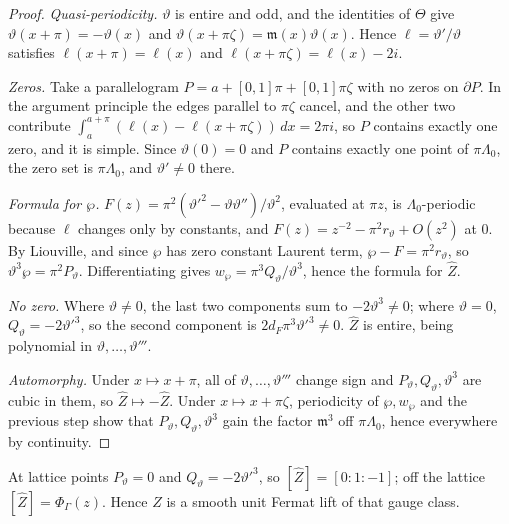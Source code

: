 \begin{proof}
\emph{Quasi-periodicity.} $\vartheta$ is entire and odd, and the identities of $\Theta$ give $\vartheta(x+\pi)=-\vartheta(x)$ and $\vartheta(x+\pi\zeta)=\mathfrak m(x)\vartheta(x)$. Hence $\ell=\vartheta'/\vartheta$ satisfies $\ell(x+\pi)=\ell(x)$ and $\ell(x+\pi\zeta)=\ell(x)-2i$.

\emph{Zeros.} Take a parallelogram $P=a+[0,1]\pi+[0,1]\pi\zeta$ with no zeros on $\partial P$. In the argument principle the edges parallel to $\pi\zeta$ cancel, and the other two contribute $\int_a^{a+\pi}(\ell(x)-\ell(x+\pi\zeta))\,dx=2\pi i$, so $P$ contains exactly one zero, and it is simple. Since $\vartheta(0)=0$ and $P$ contains exactly one point of $\pi\Lambda_0$, the zero set is $\pi\Lambda_0$, and $\vartheta'\ne0$ there.

\emph{Formula for $\wp$.} $F(z)=\pi^2(\vartheta'^2-\vartheta\vartheta'')/\vartheta^2$, evaluated at $\pi z$, is $\Lambda_0$-periodic because $\ell$ changes only by constants, and $F(z)=z^{-2}-\pi^2r_\vartheta+O(z^2)$ at $0$. By Liouville, and since $\wp$ has zero constant Laurent term, $\wp-F=\pi^2r_\vartheta$, so $\vartheta^3\wp=\pi^2P_\vartheta$. Differentiating gives $w_\wp=\pi^3Q_\vartheta/\vartheta^3$, hence the formula for $\hat Z$.

\emph{No zero.} Where $\vartheta\ne0$, the last two components sum to $-2\vartheta^3\ne0$; where $\vartheta=0$, $Q_\vartheta=-2\vartheta'^3$, so the second component is $2d_F\pi^3\vartheta'^3\ne0$. $\hat Z$ is entire, being polynomial in $\vartheta,\dots,\vartheta'''$.

\emph{Automorphy.} Under $x\mapsto x+\pi$, all of $\vartheta,\dots,\vartheta'''$ change sign and $P_\vartheta,Q_\vartheta,\vartheta^3$ are cubic in them, so $\hat Z\mapsto-\hat Z$. Under $x\mapsto x+\pi\zeta$, periodicity of $\wp,w_\wp$ and the previous step show that $P_\vartheta,Q_\vartheta,\vartheta^3$ gain the factor $\mathfrak m^3$ off $\pi\Lambda_0$, hence everywhere by continuity.
\end{proof}

At lattice points $P_\vartheta=0$ and $Q_\vartheta=-2\vartheta'^3$, so $[\hat Z]=[0:1:-1]$; off the lattice $[\hat Z]=\Phi_\Gamma(z)$. Hence $Z$ is a smooth unit Fermat lift of that gauge class.

